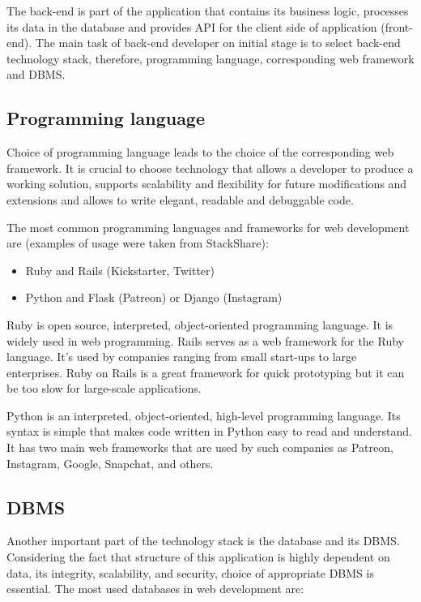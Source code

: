 \documentclass[12pt,a4paper]{report}
\begin{document}
The back-end is part of the application that contains its business logic, processes its data in the database and provides \ac{API} for the client side of application (front-end). The main task of back-end developer on initial stage is to select back-end technology stack, therefore, programming language, corresponding web framework and \ac{DBMS}.

	\subsection{Programming language}
Choice of programming language leads to the choice of the corresponding web framework. It is crucial to choose technology that allows a developer to produce a working solution, supports scalability and flexibility for future modifications and extensions and allows to write elegant, readable and debuggable code.\par
The most common programming languages and frameworks for web development are (examples of usage were taken from StackShare\cite{stackshare}):

\begin{itemize}
	\item Ruby and Rails (Kickstarter, Twitter)
	\item Python and Flask (Patreon) or Django (Instagram)
\end{itemize}

Ruby is open source,  interpreted, object-oriented programming language. It is widely used in web programming. Rails serves as a web framework for the Ruby language. It’s used by companies ranging from small start-ups to large enterprises. Ruby on Rails is a great framework for quick prototyping but it can be too slow for large-scale applications. \par
Python is an interpreted, object-oriented, high-level programming language. Its syntax is simple that makes code written in Python easy to read and understand. It has two main web frameworks that are used by such companies as Patreon, Instagram, Google, Snapchat, and others.


	\subsection{DBMS}
	
Another important part of the technology stack is the database and its \ac{DBMS}. Considering the fact that structure of this application is highly dependent on data, its integrity, scalability, and security, choice of appropriate \ac{DBMS} is essential. The most used databases in web development are:
\end{document}

